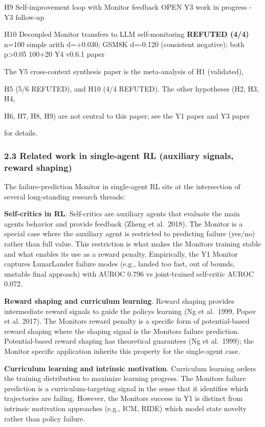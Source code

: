 \documentclass[
]{article}
\begin{document}
H9 \textbar{} Self-improvement loop with Monitor feedback \textbar{}
OPEN \textbar{} Y3 work in progress \textbar{} - \textbar{} Y3 follow-up
\textbar{}

H10 \textbar{} Decoupled Monitor transfers to LLM self-monitoring
\textbar{} \textbf{REFUTED (4/4)} \textbar{} n=100 simple arith
d=+0.030; GSM8K d=-0.120 (consistent negative); both p\textgreater0.05
\textbar{} 100+20 \textbar{} Y4 v0.6.1 paper \textbar{}

The Y5 cross-context synthesis paper is the meta-analysis of H1
(validated),

H5 (5/6 REFUTED), and H10 (4/4 REFUTED). The other hypotheses (H2, H3,
H4,

H6, H7, H8, H9) are not central to this paper; see the Y1 paper and Y3
paper

for details.

\subsubsection{2.3 Related work in single-agent RL (auxiliary signals,
reward
shaping)}\label{related-work-in-single-agent-rl-auxiliary-signals-reward-shaping}

The failure-prediction Monitor in single-agent RL sits at the
intersection of several long-standing research threads:

\textbf{Self-critics in RL}. Self-critics are auxiliary agents that
evaluate the main agents behavior and provide feedback (Zheng et
al.~2018). The Monitor is a special case where the auxiliary agent is
restricted to predicting failure (yes/no) rather than full value. This
restriction is what makes the Monitors training stable and what enables
its use as a reward penalty. Empirically, the Y1 Monitor captures
LunarLander failure modes (e.g., landed too fast, out of bounds,
unstable final approach) with AUROC 0.796 vs joint-trained self-critic
AUROC 0.072.

\textbf{Reward shaping and curriculum learning}. Reward shaping provides
intermediate reward signals to guide the policys learning (Ng et
al.~1999, Popov et al. 2017). The Monitors reward penalty is a specific
form of potential-based reward shaping where the shaping signal is the
Monitors failure prediction. Potential-based reward shaping has
theoretical guarantees (Ng et al.~1999); the Monitor specific
application inherits this property for the single-agent case.

\textbf{Curriculum learning and intrinsic motivation}. Curriculum
learning orders the training distribution to maximize learning progress.
The Monitors failure prediction is a curriculum-targeting signal in the
sense that it identifies which trajectories are failing. However, the
Monitors success in Y1 is distinct from intrinsic motivation approaches
(e.g., ICM, RIDE) which model state novelty rather than policy failure.
\end{document}
